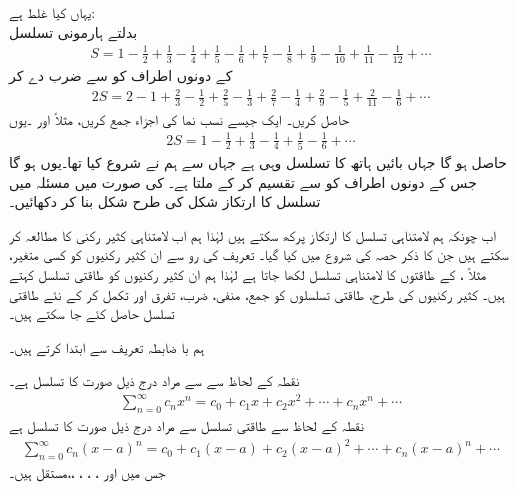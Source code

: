 یہاں کیا غلط ہے:\\
بدلتے ہارمونی تسلسل
\begin{align*}
S=1-\frac{1}{2}+\frac{1}{3}-\frac{1}{4}+\frac{1}{5}-\frac{1}{6}+\frac{1}{7}-\frac{1}{8}+\frac{1}{9}-\frac{1}{10}+\frac{1}{11}-\frac{1}{12}+\cdots
\end{align*}
کے دونوں اطراف کو  سے ضرب دے کر
\begin{align*}
2S=2-1+\frac{2}{3}-\frac{1}{2}+\frac{2}{5}-\frac{1}{3}+\frac{2}{7}-\frac{1}{4}+\frac{2}{9}-\frac{1}{5}+\frac{2}{11}-\frac{1}{6}+\cdots
\end{align*}
حاصل کریں۔ ایک جیسے نسب نما کی اجزاء جمع کریں، مثلاً  اور ۔یوں
\begin{align*}
2S=1-\frac{1}{2}+\frac{1}{3}-\frac{1}{4}+\frac{1}{5}-\frac{1}{6}+\cdots
\end{align*}
حاصل ہو گا جہاں بائیں ہاتھ کا تسلسل وہی ہے جہاں سے ہم نے شروع کیا تھا۔یوں  ہو گا جس کے دونوں اطراف کو  سے تقسیم کر کے  ملتا ہے۔
 کی صورت میں مسئلہ  میں تسلسل کا ارتکاز شکل  کی طرح شکل بنا کر دکھائیں۔

اب چونکہ ہم لامتناہی تسلسل کا ارتکاز پرکھ سکتے ہیں لہٰذا ہم اب لامتناہی کثیر رکنی کا مطالعہ کر سکتے ہیں جن کا ذکر حصہ  کی شروع میں کیا گیا۔ تعریف کی رو سے ان کثیر رکنیوں کو کسی متغیر، مثلاً ،  کے طاقتوں کا لامتناہی تسلسل لکھا جاتا ہے لہٰذا ہم ان کثیر رکنیوں کو طاقتی تسلسل کہتے ہیں۔ کثیر رکنیوں کی طرح، طاقتی تسلسلوں کو جمع، منفی، ضرب، تفرق اور تکمل کر کے نئے طاقتی تسلسل حاصل کئے جا سکتے ہیں۔

ہم با ضابطہ تعریف سے ابتدا کرتے ہیں۔

نقطہ  کے لحاظ سے  سے مراد درج ذیل صورت کا تسلسل ہے۔
\begin{align}\label{مساوات_تسلسل_تعریف_طاقتی_الف}
\sum_{n=0}^{\infty}c_nx^n=c_0+c_1x+c_2x^2+\cdots+c_nx^n+\cdots
\end{align}
نقطہ  کے لحاظ سے طاقتی تسلسل سے مراد درج ذیل صورت کا تسلسل ہے
\begin{align}\label{مساوات_تسلسل_تعریف_طاقتی_ب}
\sum_{n=0}^{\infty}c_n(x-a)^n=c_0+c_1(x-a)+c_2(x-a)^2+\cdots+c_n(x-a)^n+\cdots
\end{align}
جس میں   اور  ، ، ، ،، مستقل ہیں۔

